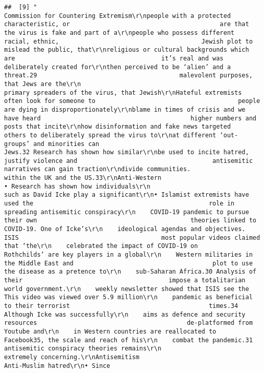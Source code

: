 \documentclass[
]{book}
\begin{document}
\begin{verbatim}
##  [9] "                                                    Commission for Countering Extremism\r\npeople with a protected characteristic, or                                         are that the virus is fake and part of a\r\npeople who possess different racial, ethnic,                                       Jewish plot to mislead the public, that\r\nreligious or cultural backgrounds which are                                        it’s real and was deliberately created for\r\nthen perceived to be ‘alien’ and a threat.29                                       malevolent purposes, that Jews are the\r\n                                                                                   primary spreaders of the virus, that Jewish\r\nHateful extremists often look for someone to                                       people are dying in disproportionately\r\nblame in times of crisis and we have heard                                         higher numbers and posts that incite\r\nhow disinformation and fake news targeted                                          others to deliberately spread the virus to\r\nat different ‘out-groups’ and minorities can                                       Jews.32 Research has shown how similar\r\nbe used to incite hatred, justify violence and                                     antisemitic narratives can gain traction\r\ndivide communities.                                                                within the UK and the US.33\r\nAnti-Western                                                                   • Research has shown how individuals\r\n                                                                                   such as David Icke play a significant\r\n• Islamist extremists have used the                                                role in spreading antisemitic conspiracy\r\n    COVID-19 pandemic to pursue their own                                          theories linked to COVID-19. One of Icke’s\r\n    ideological agendas and objectives. ISIS                                       most popular videos claimed that ‘the\r\n    celebrated the impact of COVID-19 on                                           Rothchilds’ are key players in a global\r\n    Western militaries in the Middle East and                                      plot to use the disease as a pretence to\r\n    sub-Saharan Africa.30 Analysis of their                                        impose a totalitarian world government.\r\n    weekly newsletter showed that ISIS see the                                     This video was viewed over 5.9 million\r\n    pandemic as beneficial to their terrorist                                      times.34 Although Icke was successfully\r\n    aims as defence and security resources                                         de-platformed from Youtube and\r\n    in Western countries are reallocated to                                        Facebook35, the scale and reach of his\r\n    combat the pandemic.31                                                         antisemitic conspiracy theories remains\r\n                                                                                   extremely concerning.\r\nAntisemitism                                                                   Anti-Muslim hatred\r\n• Since 
\end{verbatim}
\end{document}
